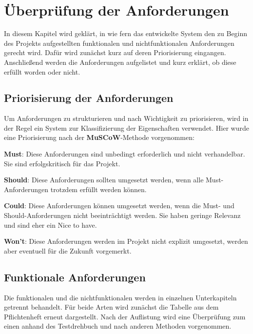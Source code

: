 \documentclass[../review_3.tex]{subfiles}
\begin{document}
\chapter{Überprüfung der Anforderungen}\thispagestyle{fancy}

In diesem Kapitel wird geklärt, in wie fern das entwickelte System den zu Beginn des Projekts aufgestellten funktionalen und nichtfunktionalen Anforderungen gerecht wird. Dafür wird zunächst kurz auf deren Priorisierung eingangen. Anschließend werden die Anforderungen aufgelistet und kurz erklärt, ob diese erfüllt worden oder nicht.

\section{Priorisierung der Anforderungen}\thispagestyle{fancy}
Um Anforderungen zu strukturieren und nach Wichtigkeit zu priorisieren, wird in der Regel ein System zur Klassifizierung der Eigenschaften verwendet. Hier wurde eine Priorisierung nach der \textbf{MuSCoW}-Methode vorgenommen:
\begin{description}
    \item{\textbf{Must}:} Diese Anforderungen sind unbedingt erforderlich und nicht verhandelbar. Sie sind erfolgskritisch für das Projekt.
    \item{\textbf{Should}:} Diese Anforderungen sollten umgesetzt werden, wenn alle Must-Anforderungen trotzdem erfüllt werden können.
    \item{\textbf{Could}:} Diese Anforderungen können umgesetzt werden, wenn die Must- und Should-Anforderungen nicht beeinträchtigt werden. Sie haben geringe Relevanz und sind eher ein \glqq Nice to have\grqq.
    \item{\textbf{Won't}:} Diese Anforderungen werden im Projekt nicht explizit umgesetzt, werden aber eventuell für die Zukunft vorgemerkt.
\end{description}

\section{Funktionale Anforderungen}

Die funktionalen und die nichtfunktionalen werden in einzelnen Unterkapiteln getrennt behandelt. Für beide Arten wird zunächst die Tabelle aus dem Pflichtenheft erneut dargestellt. Nach der Auflistung wird eine Überprüfung zum einen anhand des Testdrehbuch und nach anderen Methoden vorgenommen.
\end{document}
